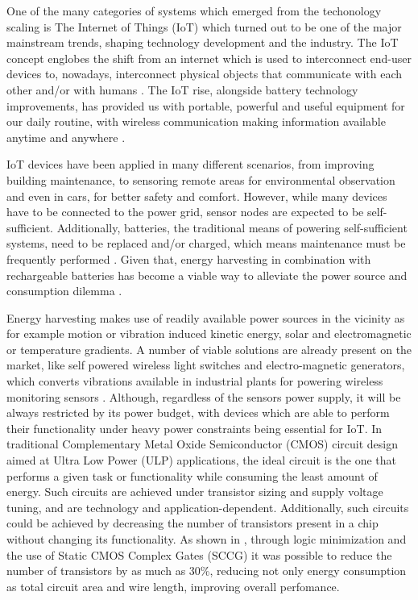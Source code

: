 \documentclass[pgmicro,diss,english]{iiufrgs}
\begin{document}
    One of the many categories of systems which emerged from the techonology scaling is The Internet of Things (IoT) which turned out to be one of the major mainstream trends, shaping technology development and the industry. The IoT concept englobes the shift from an internet which is used to interconnect end-user devices to, nowadays, interconnect physical objects that communicate with each other and/or with humans \cite{miorandi2012internet}. The IoT rise, alongside battery technology improvements, has provided us with portable, powerful and useful equipment for our daily routine, with wireless communication making information available anytime and anywhere \cite{manoli2010energy}.

    IoT devices have been applied in many different scenarios, from improving building maintenance, to sensoring remote areas for environmental observation and even in cars, for better safety and comfort. However, while many devices have to be connected to the power grid, sensor nodes are expected to be self-sufficient. Additionally, batteries, the traditional means of powering self-sufficient systems, need to be replaced and/or charged, which means maintenance must be frequently performed \cite{bleitner2018comparison}. Given that, energy harvesting in combination with rechargeable batteries has become a viable way to alleviate the power source and consumption dilemma \cite{manoli2010energy}.

    Energy harvesting makes use of readily available power sources in the vicinity as for example motion or vibration induced kinetic energy, solar and electromagnetic or temperature gradients. A number of viable solutions are already present on the market, like self powered wireless light switches and electro-magnetic generators, which converts vibrations available in industrial plants for powering wireless monitoring sensors \cite{manoli2010energy} \cite{bleitner2018comparison}. Although, regardless of the sensors power supply, it will be always restricted by its power budget, with devices which are able to perform their functionality under heavy power constraints being essential for IoT. In traditional Complementary Metal Oxide Semiconductor (CMOS) circuit design aimed at Ultra Low Power (ULP) applications, the ideal circuit is the one that performs a given task or functionality while consuming the least amount of energy. Such circuits are achieved under transistor sizing and supply voltage tuning, and are technology and application-dependent. Additionally, such circuits could be achieved by decreasing the number of transistors present in a chip without changing its functionality. As shown in \cite{reis1995associating}, through logic minimization and the use of Static CMOS Complex Gates (SCCG) it was possible to reduce the number of transistors by as much as 30\%, reducing not only energy consumption as total circuit area and wire length, improving overall perfomance. 
\end{document}
